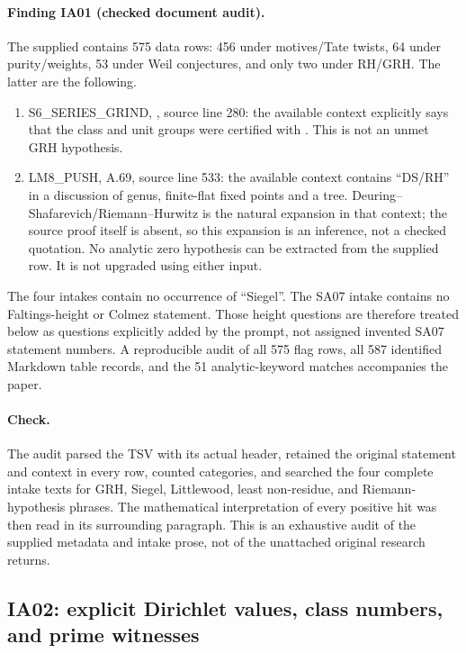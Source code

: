 \documentclass[11pt,a4paper]{article}
\theoremstyle{definition}
\begin{document}
\paragraph{Finding IA01 (checked document audit).}
The supplied  contains 575 data rows: 456 under
motives/Tate twists, 64 under purity/weights, 53 under Weil conjectures, and
only two under RH/GRH.  The latter are the following.
\begin{enumerate}
\item S6\_SERIES\_GRIND, , source line 280:
the available context explicitly says that the class and unit groups were
certified with .  This is not an unmet GRH hypothesis.
\item LM8\_PUSH, A.69, source line 533: the available context contains
``DS/RH'' in a discussion of genus, finite-flat fixed points and a tree.
Deuring--Shafarevich/Riemann--Hurwitz is the natural expansion in that
context; the source proof itself is absent, so this expansion is an
inference, not a checked quotation.  No analytic zero hypothesis can be
extracted from the supplied row.  It is not upgraded using either input.
\end{enumerate}
The four intakes contain no occurrence of ``Siegel''.  The SA07 intake
contains no Faltings-height or Colmez statement.  Those height questions
are therefore treated below as questions explicitly added by the prompt,
not assigned invented SA07 statement numbers.  A reproducible audit of
all 575 flag rows, all 587 identified Markdown table records, and the 51
analytic-keyword matches accompanies the paper.

\paragraph{Check.}
The audit parsed the TSV with its actual header, retained the original
statement and context in every row, counted categories, and searched the
four complete intake texts for GRH, Siegel, Littlewood, least non-residue,
and Riemann-hypothesis phrases.  The mathematical interpretation of every
positive hit was then read in its surrounding paragraph.  This is an
exhaustive audit of the supplied metadata and intake prose, not of the
unattached original research returns.

\subsection{IA02: explicit Dirichlet values, class numbers, and prime witnesses}
\end{document}
